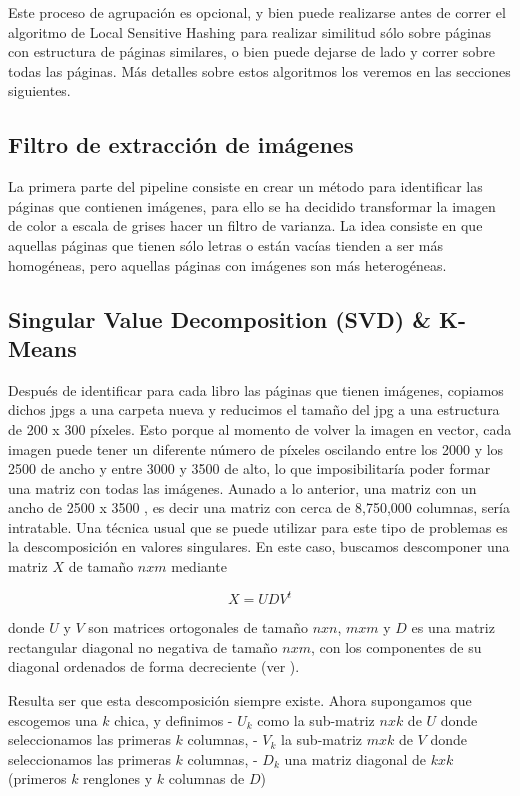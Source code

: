Este proceso de agrupación es opcional, y bien puede realizarse antes de correr el algoritmo de Local Sensitive Hashing para realizar similitud sólo sobre páginas con estructura de páginas similares, o bien puede dejarse de lado y correr sobre todas las páginas. Más detalles sobre estos algoritmos los veremos en las secciones siguientes.

\subsection{Filtro de extracción de imágenes}

La primera parte del pipeline consiste en crear un método para identificar las páginas que contienen imágenes, para ello se ha decidido transformar la imagen de color a escala de grises hacer un filtro de varianza. La idea consiste en que aquellas páginas que tienen sólo letras o están vacías tienden a ser más homogéneas, pero aquellas páginas con imágenes son más heterogéneas.





\subsection{ Singular Value Decomposition (SVD) \& K-Means}

Después de identificar para cada libro las páginas que tienen imágenes, copiamos dichos jpgs a una carpeta nueva y reducimos el tamaño del jpg a una estructura de 200 x 300 píxeles. Esto porque al momento de volver la imagen en vector, cada imagen puede tener un diferente número de píxeles oscilando entre los 2000 y los 2500 de ancho y entre 3000 y 3500 de alto, lo que imposibilitaría poder formar una matriz con todas las imágenes. Aunado a lo anterior, una matriz con un ancho de 2500 x 3500 , es decir una matriz con cerca de 8,750,000 columnas, sería intratable. 
Una técnica usual que se puede utilizar para este tipo de problemas
es la descomposición en valores singulares. En este caso, buscamos descomponer
una matriz $X$ de tamaño $nxm$ mediante


$$X=UDV^t$$

donde $U$ y $V$ son matrices ortogonales de tamaño $nxn$, $mxm$ y $D$ es una matriz
rectangular diagonal no negativa de tamaño $nxm$, con los componentes de su diagonal ordenados de forma decreciente (ver \cite{leskovec2014mining}). 

Resulta ser que esta descomposición siempre existe. Ahora supongamos que escogemos una $k$ chica, y definimos
- $U_k$ como la sub-matriz $nxk$  de $U$ donde seleccionamos las primeras $k$ columnas,
-  $V_k$ la sub-matriz $mxk$ de $V$ donde seleccionamos las primeras $k$ columnas,
- $D_k$ una matriz diagonal de $kxk$ (primeros $k$ renglones y $k$ columnas de $D$)

